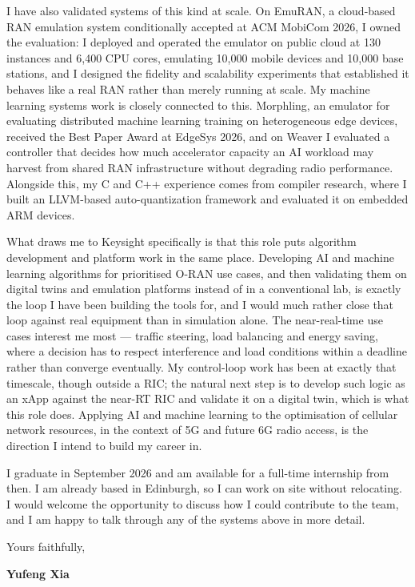 \documentclass[letterpaper,11pt]{article}
\begin{document}
I have also validated systems of this kind at scale. On EmuRAN, a cloud-based
RAN emulation system conditionally accepted at ACM MobiCom 2026, I owned the
evaluation: I deployed and operated the emulator on public cloud at 130 instances
and 6,400 CPU cores, emulating 10,000 mobile devices and 10,000 base stations,
and I designed the fidelity and scalability experiments that established it
behaves like a real RAN rather than merely running at scale. My machine learning
systems work is closely connected to this. Morphling, an emulator for evaluating
distributed machine learning training on heterogeneous edge devices, received the
Best Paper Award at EdgeSys 2026, and on Weaver I evaluated a controller that
decides how much accelerator capacity an AI workload may harvest from shared RAN
infrastructure without degrading radio performance. Alongside this, my C and C++
experience comes from compiler research, where I built an LLVM-based
auto-quantization framework and evaluated it on embedded ARM devices.

What draws me to Keysight specifically is that this role puts algorithm
development and platform work in the same place. Developing AI and machine
learning algorithms for prioritised O-RAN use cases, and then validating them on
digital twins and emulation platforms instead of in a conventional lab, is
exactly the loop I have been building the tools for, and I would much rather
close that loop against real equipment than in simulation alone. The near-real-time
use cases interest me most --- traffic steering, load balancing and energy saving,
where a decision has to respect interference and load conditions within a deadline
rather than converge eventually. My control-loop work has been at exactly that
timescale, though outside a RIC; the natural next step is to develop such logic as
an xApp against the near-RT RIC and validate it on a digital twin, which is what
this role does. Applying AI and machine learning to the optimisation of cellular
network resources, in the context of 5G and future 6G radio access, is the
direction I intend to build my career in.

I graduate in September 2026 and am available for a full-time internship from
then. I am already based in Edinburgh, so I can work on site without relocating.
I would welcome the opportunity to discuss how I could contribute to the team,
and I am happy to talk through any of the systems above in more detail.

\vspace{10pt}

Yours faithfully,

\vspace{14pt}

\textbf{Yufeng Xia}
\end{document}
